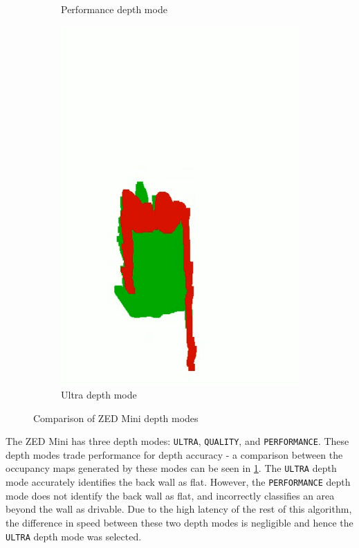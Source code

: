 \begin{figure}[p]
\begin{subfigure}{.2\textwidth}
        \caption{Performance depth mode}
    \end{subfigure}
    \begin{subfigure}{.2\textwidth}
        \centering
        \includegraphics[width=\linewidth,frame]{images/pcloud_indoor_ultra.PNG}
        \caption{Ultra depth mode}
    \end{subfigure}
    \caption{Comparison of ZED Mini depth modes}
    \label{fig:depth_mode_comparison}
\end{figure}\clearpage

The ZED Mini has three depth modes: \texttt{ULTRA}, \texttt{QUALITY}, and \texttt{PERFORMANCE}.
These depth modes trade performance for depth accuracy - a comparison between the occupancy maps
generated by these modes can be seen in \cref{fig:depth_mode_comparison}.
The \texttt{ULTRA} depth mode accurately identifies the back wall as flat.
However, the \texttt{PERFORMANCE} depth mode does not identify the back wall
as flat, and incorrectly classifies an area beyond the wall as drivable.
Due to the high latency of the rest of this algorithm, the difference in speed between these two depth modes is negligible
and hence the \texttt{ULTRA} depth mode was selected.

